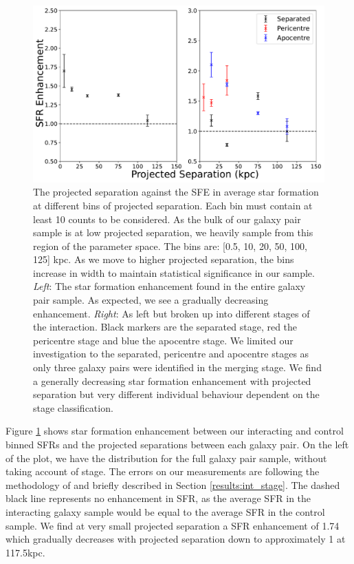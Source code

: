 \begin{figure}
\centering
\includegraphics[width=\textwidth]{Chapter3/figures/sfr-enhancement-projected-sep.pdf}
\caption[The projected separation against the SFE in average star formation at different bins of projected separation.]{The projected separation against the SFE in average star formation at different bins of projected separation. Each bin must contain at least 10 counts to be considered. As the bulk of our galaxy pair sample is at low projected separation, we heavily sample from this region of the parameter space. The bins are: [0.5, 10, 20, 50, 100, 125] kpc. As we move to higher projected separation, the bins increase in width to maintain statistical significance in our sample. \textit{Left}: The star formation enhancement found in the entire galaxy pair sample. As expected, we see a gradually decreasing enhancement. \textit{Right}: As left but broken up into different stages of the interaction. Black markers are the separated stage, red the pericentre stage and blue the apocentre stage. We limited our investigation to the separated, pericentre and apocentre stages as only three galaxy pairs were identified in the merging stage. We find a generally decreasing star formation enhancement with projected separation but very different individual behaviour dependent on the stage classification.}
\label{fig:sfr-enhancement-sep}
\end{figure}

Figure \ref{fig:sfr-enhancement-sep} shows star formation enhancement between our interacting and control binned SFRs and the projected separations between each galaxy pair. On the left of the plot, we have the distribution for the full galaxy pair sample, without taking account of stage. The errors on our measurements are following the methodology of \citet{2011PASA...28..128C} and briefly described in Section \ref{results:int_stage}. The dashed black line represents no enhancement in SFR, as the average SFR in the interacting galaxy sample would be equal to the average SFR in the control sample. We find at very small projected separation a SFR enhancement of 1.74 which gradually decreases with projected separation down to approximately 1 at 117.5kpc. 

